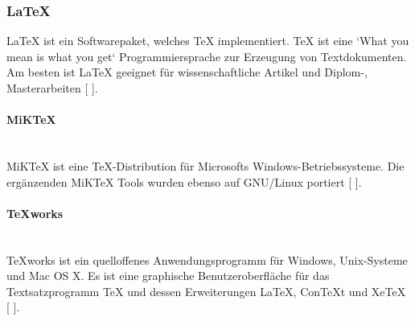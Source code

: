 \documentclass[FIPLY_base.tex]{subfiles}
\begin{document}
\subsubsection{LaTeX}
LaTeX ist ein Softwarepaket, welches TeX implementiert. TeX ist eine `What you mean is what you get` Programmiersprache zur Erzeugung von Textdokumenten. Am besten ist LaTeX geeignet für wissenschaftliche Artikel und Diplom-, Masterarbeiten [ \cite{lxLatex}].

\paragraph{MiKTeX}\ \\
MiKTeX ist eine TeX-Distribution für Microsofts Windows-Betriebssysteme. Die ergänzenden MiKTeX Tools wurden ebenso auf GNU/Linux portiert [ \cite{lxMiktex}].

\paragraph{TeXworks}\ \\
TeXworks ist ein quelloffenes Anwendungsprogramm für Windows, Unix-Systeme und Mac OS X. Es ist eine graphische Benutzeroberfläche für das Textsatzprogramm TeX und dessen Erweiterungen LaTeX, ConTeXt und XeTeX [ \cite{lxTexworks}].
\end{document}
